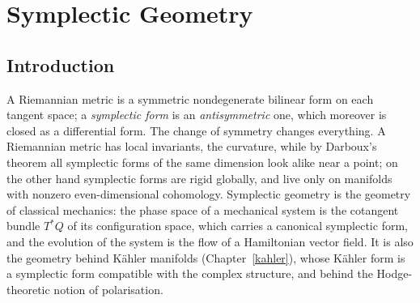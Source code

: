 \chapter{Symplectic Geometry}\label{symplectic-geometry}

\section{Introduction}\label{symplectic-geometry:section-introduction}

A Riemannian metric is a symmetric nondegenerate bilinear form on each tangent space; a \emph{symplectic form} is an \emph{antisymmetric} one, which moreover is closed as a differential form. The
change of symmetry changes everything. A Riemannian metric has local invariants, the curvature, while by Darboux's theorem all symplectic forms of the same dimension look alike near a point; on the
other hand symplectic forms are rigid globally, and live only on manifolds with nonzero even-dimensional cohomology. Symplectic geometry is the geometry of classical mechanics: the phase space of a
mechanical system is the cotangent bundle $T^*Q$ of its configuration space, which carries a canonical symplectic form, and the evolution of the system is the flow of a Hamiltonian vector field. It is also
the geometry behind Kähler manifolds (Chapter~\ref{kahler}), whose K\"ahler form is a symplectic form compatible with the complex structure, and behind the Hodge-theoretic notion of polarisation.

